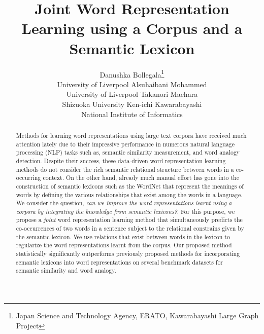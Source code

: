 \documentclass[letterpaper]{article}
\begin{document}
%
\title{Joint Word  Representation Learning using a Corpus and a Semantic Lexicon}


\author{Danushka Bollegala\thanks{Japan Science and Technology Agency, ERATO, Kawarabayashi Large Graph Project} \\ University of Liverpool \And
 Alsuhaibani Mohammed \\ University of Liverpool \And
Takanori Maehara\footnotemark[1] \\
Shizuoka University  \And
Ken-ichi Kawarabayashi\footnotemark[1] \\
National Institute of Informatics}


\maketitle
\begin{abstract}
Methods for learning word representations using large text corpora have received much attention lately due to their impressive performance
in numerous natural language processing (NLP) tasks such as, semantic similarity measurement, and word analogy detection.
Despite their success, these data-driven word representation learning methods do not consider
the rich semantic relational structure between words in a co-occurring context. 
On the other hand, already much manual effort has gone into the construction of semantic lexicons such as the WordNet
that represent the meanings of words by defining the various relationships that exist among the words in a language.
We consider the question, \emph{can we improve the word representations learnt using a corpora by integrating the
knowledge from semantic lexicons?}. For this purpose, we propose a \emph{joint} word representation learning method that simultaneously predicts
the co-occurrences of two words in a sentence subject to the relational constrains given by the semantic lexicon.
We use relations that exist between words in the lexicon to regularize the word representations learnt from the corpus.
Our proposed method statistically significantly outperforms previously proposed methods for incorporating semantic lexicons into word
representations on several benchmark datasets for semantic similarity and word analogy.
\end{abstract}
\end{document}
